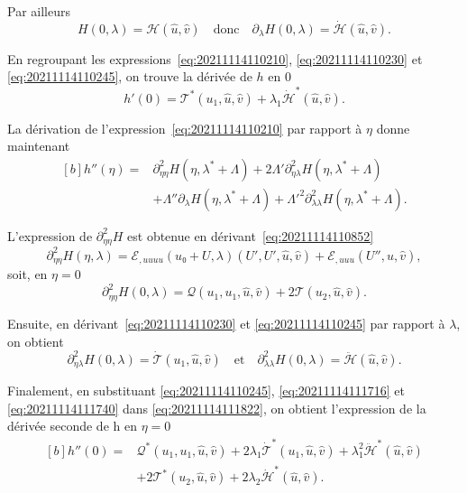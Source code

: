 \documentclass[12pt, final]{amsart}
\begin{document}
Par ailleurs
\begin{equation}
  \label{eq:20211114110245}
  H(0, \lambda)=\mathcal H(\hat{u}, \hat{v})
  \quad\text{donc}\quad
  \partial_\lambda H(0, \lambda)=\dot{\mathcal H}(\hat{u}, \hat{v}).
\end{equation}

En regroupant les expressions~\eqref{eq:20211114110210},
\eqref{eq:20211114110230} et \eqref{eq:20211114110245}, on trouve la dérivée de
\(h\) en 0
\begin{equation}
  h'(0)=\mathcal T^\ast(u_1, \hat{u}, \hat{v})
  +\lambda_1\dot{\mathcal H}^\ast(\hat{u}, \hat{v}).
\end{equation}

La dérivation de l'expression~\eqref{eq:20211114110210} par rapport à \(\eta\)
donne maintenant
\begin{equation}
  \label{eq:20211114111822}
  \begin{aligned}[b]
    h''(\eta)={}&\partial_{\eta\eta}^2 H(\eta, \lambda^\ast+\Lambda)
    +2\Lambda'\partial_{\eta\lambda}^2 H(\eta, \lambda^\ast+\Lambda)\\
    &+\Lambda''\partial_{\lambda}H(\eta, \lambda^\ast+\Lambda)
    +\Lambda'^2\partial_{\lambda\lambda}^2H(\eta, \lambda^\ast+\Lambda).
  \end{aligned}
\end{equation}

L'expression de \(\partial_{\eta\eta}^2H\) est obtenue en
dérivant~\eqref{eq:20211114110852}
\begin{equation}
  \partial_{\eta\eta}^2H(\eta, \lambda)
  =\mathcal E_{,uuuu}(u₀+U, \lambda)(U', U', \hat{u}, \hat{v})
  +\mathcal E_{,uuu}(U'', \hat{u}, \hat{v}),
\end{equation}
soit, en \(\eta=0\)
\begin{equation}
  \label{eq:20211114111716}
  \partial_{\eta\eta}^2H(0, \lambda)=\mathcal Q(u_1, u_1, \hat{u}, \hat{v})
  +2\mathcal T(u_2, \hat{u}, \hat{v}).
\end{equation}

Ensuite, en dérivant~\eqref{eq:20211114110230} et \eqref{eq:20211114110245} par
rapport à \(\lambda\), on obtient
\begin{equation}
  \label{eq:20211114111740}
  \partial_{\eta\lambda}^2H(0, \lambda)=\dot{\mathcal T}(u_1, \hat{u}, \hat{v})
  \quad\text{et}\quad
  \partial_{\lambda\lambda}^2H(0, \lambda)=\ddot{\mathcal H}(\hat{u}, \hat{v}).
\end{equation}

Finalement, en substituant \eqref{eq:20211114110245}, \eqref{eq:20211114111716}
et \eqref{eq:20211114111740} dans \eqref{eq:20211114111822}, on obtient
l'expression de la dérivée seconde de h en \(\eta=0\)
\begin{equation}
  \begin{aligned}[b]
    h''(0)={}&\mathcal Q^\ast(u_1, u_1, \hat{u}, \hat{v})
    +2\lambda_1\dot{\mathcal T}^\ast(u_1, \hat{u}, \hat{v})
    +\lambda_1^2\ddot{\mathcal H}^\ast(\hat{u}, \hat{v})\\
    &+2\mathcal T^\ast(u_2, \hat{u}, \hat{v})
    +2\lambda_2\dot{\mathcal H}^\ast(\hat{u}, \hat{v}).
  \end{aligned}
\end{equation}
\end{document}
